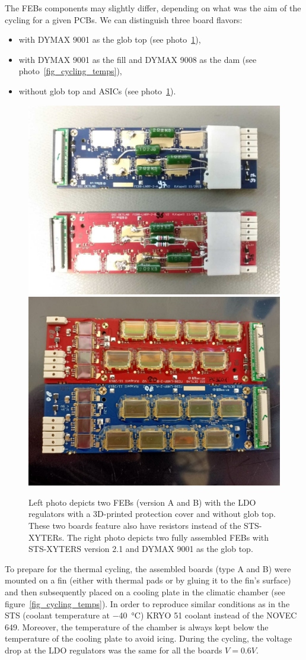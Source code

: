 The \gls{FEB}s components may slightly differ, depending on what was the aim of the cycling for a given \glspl{PCB}. We can distinguish three board flavors:
\begin{itemize}
    \item with DYMAX 9001 as the glob top (see photo~\ref{fig_noglobtop}),
    \item with DYMAX 9001 as the fill and DYMAX 9008 as the dam (see photo~\ref{fig_cycling_temps}), 
    \item without glob top and \glspl{ASIC} (see photo~\ref{fig_noglobtop}).
    \end{itemize}
\newpage
\begin{figure}[!h]
\centering
\includegraphics[width=0.45\columnwidth]{Chapter3/Cycling/Images/noglobtop.jpg}
\includegraphics[width=0.45\columnwidth]{Chapter3/Cycling/Images/globtop.jpg}
\caption{Left photo depicts two \glspl{FEB} (version A and B) with the \gls{LDO} regulators with a 3D-printed protection cover and without glob top. These two boards feature also have resistors instead of the \gls{STS}-XYTERs.
The right photo depicts two fully assembled \gls{FEB}s with \gls{STS}-XYTERS version 2.1 and DYMAX 9001 as the glob top.}
\label{fig_noglobtop}
\end{figure}

To prepare for the thermal cycling, the assembled boards (type A and B) were mounted on a fin (either with thermal pads or by gluing it to the fin's surface) and then subsequently placed on a cooling plate in the climatic chamber (see figure~\ref{fig_cycling_temps}). In order to reproduce similar conditions as in the \gls{STS} (coolant temperature at \SI{-40}{\celsius}) KRYO 51 coolant instead of the NOVEC 649. Moreover, the temperature of the chamber is always kept below the temperature of the cooling plate to avoid icing. During the cycling, the voltage drop at the \gls{LDO} regulators was the same for all the boards $V=0.6V$. 


